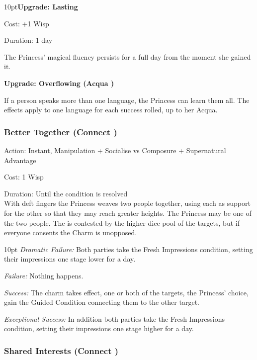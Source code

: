\begin{myindentpar}{10pt}\textbf{Upgrade: Lasting}

\noindent Cost: +1 Wisp

\noindent Duration: 1 day

The Princess' magical fluency persists for a full day from the moment she gained it.

\textbf{Upgrade: Overflowing (Acqua \textbullet\textbullet)}

If a person speaks more than one language, the Princess can learn them all. The effects apply to one language for each success rolled, up to her Acqua.\end{myindentpar}

\subsubsection*{Better Together (Connect \textbullet\textbullet)}

\noindent Action: Instant, Manipulation + Socialise vs Composure + Supernatural Advantage

\noindent Cost: 1 Wisp

\noindent Duration: Until the condition is resolved \\

\noindent With deft fingers the Princess weaves two people together, using each as support for the other so that they may reach greater heights. The Princess may be one of the two people. The is contested by the higher dice pool of the targets, but if everyone consents the Charm is unopposed. 

\begin{myindentpar}{10pt}
    \emph{Dramatic Failure:} Both parties take the Fresh Impressions condition, setting their impressions one stage lower for a day. 
    
    \emph{Failure:} Nothing happens. 
    
    \emph{Success:} The charm takes effect, one or both of the targets, the Princess' choice, gain the Guided Condition connecting them to the other target.
    
    \emph{Exceptional Success:} In addition both parties take the Fresh Impressions condition, setting their impressions one stage higher for a day. 
\end{myindentpar}

\subsubsection*{Shared Interests (Connect \textbullet\textbullet)}

